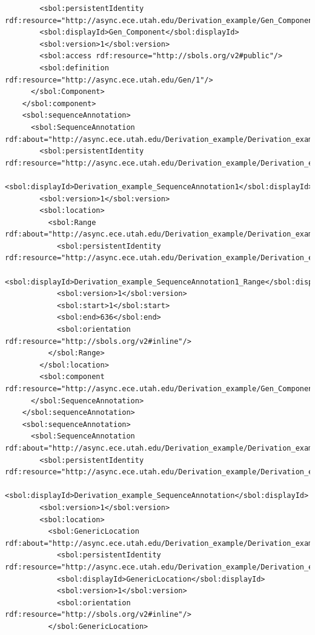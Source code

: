 \begin{lstlisting}
        <sbol:persistentIdentity rdf:resource="http://async.ece.utah.edu/Derivation_example/Gen_Component"/>
        <sbol:displayId>Gen_Component</sbol:displayId>
        <sbol:version>1</sbol:version>
        <sbol:access rdf:resource="http://sbols.org/v2#public"/>
        <sbol:definition rdf:resource="http://async.ece.utah.edu/Gen/1"/>
      </sbol:Component>
    </sbol:component>
    <sbol:sequenceAnnotation>
      <sbol:SequenceAnnotation rdf:about="http://async.ece.utah.edu/Derivation_example/Derivation_example_SequenceAnnotation1/1">
        <sbol:persistentIdentity rdf:resource="http://async.ece.utah.edu/Derivation_example/Derivation_example_SequenceAnnotation1"/>
        <sbol:displayId>Derivation_example_SequenceAnnotation1</sbol:displayId>
        <sbol:version>1</sbol:version>
        <sbol:location>
          <sbol:Range rdf:about="http://async.ece.utah.edu/Derivation_example/Derivation_example_SequenceAnnotation1/Derivation_example_SequenceAnnotation1_Range/1">
            <sbol:persistentIdentity rdf:resource="http://async.ece.utah.edu/Derivation_example/Derivation_example_SequenceAnnotation1/Derivation_example_SequenceAnnotation1_Range"/>
            <sbol:displayId>Derivation_example_SequenceAnnotation1_Range</sbol:displayId>
            <sbol:version>1</sbol:version>
            <sbol:start>1</sbol:start>
            <sbol:end>636</sbol:end>
            <sbol:orientation rdf:resource="http://sbols.org/v2#inline"/>
          </sbol:Range>
        </sbol:location>
        <sbol:component rdf:resource="http://async.ece.utah.edu/Derivation_example/Gen_Component/1"/>
      </sbol:SequenceAnnotation>
    </sbol:sequenceAnnotation>
    <sbol:sequenceAnnotation>
      <sbol:SequenceAnnotation rdf:about="http://async.ece.utah.edu/Derivation_example/Derivation_example_SequenceAnnotation/1">
        <sbol:persistentIdentity rdf:resource="http://async.ece.utah.edu/Derivation_example/Derivation_example_SequenceAnnotation"/>
        <sbol:displayId>Derivation_example_SequenceAnnotation</sbol:displayId>
        <sbol:version>1</sbol:version>
        <sbol:location>
          <sbol:GenericLocation rdf:about="http://async.ece.utah.edu/Derivation_example/Derivation_example_SequenceAnnotation/GenericLocation/1">
            <sbol:persistentIdentity rdf:resource="http://async.ece.utah.edu/Derivation_example/Derivation_example_SequenceAnnotation/GenericLocation"/>
            <sbol:displayId>GenericLocation</sbol:displayId>
            <sbol:version>1</sbol:version>
            <sbol:orientation rdf:resource="http://sbols.org/v2#inline"/>
          </sbol:GenericLocation>

\end{lstlisting}
